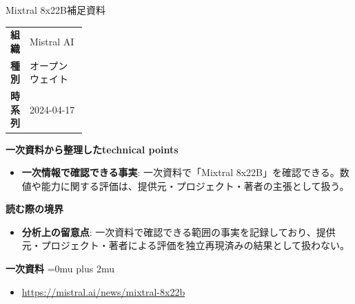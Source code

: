 \begin{technicalnote}{Mixtral 8x22B}{補足資料}
\begingroup
\begin{tabularx}{\linewidth}{@{}>{\bfseries}p{0.22\linewidth}X@{}}
組織 & Mistral AI \\
種別 & オープンウェイト \\
時系列 & 2024-04-17 \\
\end{tabularx}
\smallskip
{\bfseries 一次資料から整理したtechnical points}
\begin{itemize}[leftmargin=1.5em,itemsep=0.35em]
\item \textbf{一次情報で確認できる事実}: 一次資料で「Mixtral 8x22B」を確認できる。数値や能力に関する評価は、提供元・プロジェクト・著者の主張として扱う。
\end{itemize}
\begin{minipage}{\linewidth}
{\bfseries 読む際の境界}
\begin{itemize}[leftmargin=1.5em,itemsep=0.35em]
\item \textbf{分析上の留意点}: 一次資料で確認できる範囲の事実を記録しており、提供元・プロジェクト・著者による評価を独立再現済みの結果として扱わない。
\end{itemize}
\begin{samepage}
{\bfseries 一次資料}
\begingroup\sloppy
\Urlmuskip=0mu plus 2mu\relax
\begin{itemize}[leftmargin=1.5em,itemsep=0.25em]
\item {\scriptsize\url{https://mistral.ai/news/mixtral-8x22b}}
\end{itemize}
\endgroup
\end{samepage}
\end{minipage}
\endgroup
\end{technicalnote}
\medskip

